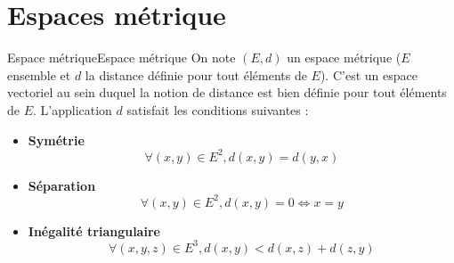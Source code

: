 \section{Espaces métrique}
\begin{definition}{Espace métrique}{Espace métrique}
    On note $(E,d)$ un espace métrique ($E$ ensemble et $d$ la distance définie pour tout éléments de $E$). C'est un espace vectoriel au sein duquel la notion de distance est bien définie pour tout éléments de $E$. L'application $d$ satisfait les conditions suivantes :
    \begin{itemize}
        \item \textbf{Symétrie}
        \begin{equation}
            \forall (x,y) \in E^{2}, d(x,y) = d(y,x) \nonumber
        \end{equation} 
        \item \textbf{Séparation}
        \begin{equation}
            \forall (x,y) \in E^{2}, d(x,y) = 0 \Longleftrightarrow x = y \nonumber
        \end{equation} 
        \item \textbf{Inégalité triangulaire}
        \begin{equation}
            \forall (x,y,z) \in E^{3}, d(x,y) < d(x,z) + d(z,y) \nonumber
        \end{equation} 
    \end{itemize}
\end{definition}
